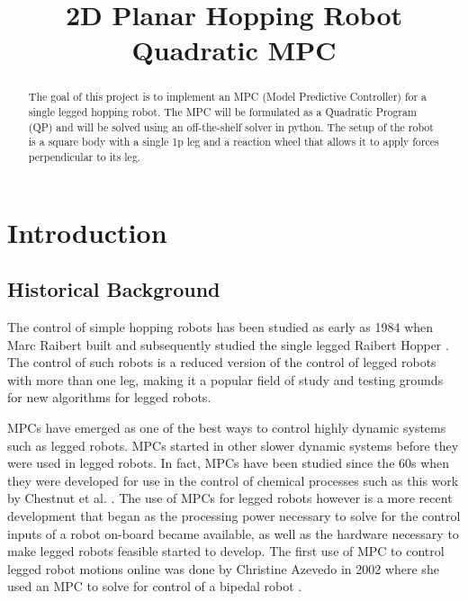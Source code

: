 \documentclass[conference]{IEEEtran}
\begin{document}
\title{2D Planar Hopping Robot Quadratic MPC}

\author{}

\maketitle

\begin{abstract}
    The goal of this project is to implement an MPC (Model Predictive Controller) for a single legged hopping robot.
    The MPC will be formulated as a Quadratic Program (QP) and will be solved using an off-the-shelf solver in python.
    The setup of the robot is a square body with a single 1p leg and a reaction wheel that allows it to apply forces perpendicular to its leg.
\end{abstract}

\section{Introduction}
\label{sec:introduction}


\subsection{Historical Background}

The control of simple hopping robots has been studied as early as 1984 when Marc Raibert built and subsequently studied the single legged Raibert Hopper \cite{raibert_experiments_1984}.
The control of such robots is a reduced version of the control of legged robots with more than one leg, making it a popular field of study and testing grounds for new algorithms for legged robots.

MPCs have emerged as one of the best ways to control highly dynamic systems such as legged robots.
MPCs started in other slower dynamic systems before they were used in legged robots.
In fact, MPCs have been studied since the 60s when they were developed for use in the control of chemical processes such as this work by Chestnut et al. \cite{chestnut_predictive-control_1961}.
The use of MPCs for legged robots however is a more recent development that began as the processing power necessary to solve for the control inputs of a robot on-board became available, as well as the hardware necessary to make legged robots feasible started to develop.
The first use of MPC to control legged robot motions online was done by Christine Azevedo in 2002 where she used an MPC to solve for control of a bipedal robot \cite{azevedo_line_2002}.
\end{document}
